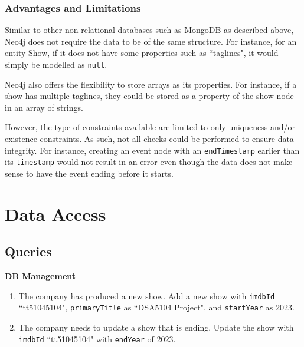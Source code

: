 \documentclass[10pt,titlepage]{article}
\begin{document}
\subsubsection{Advantages and Limitations}
Similar to other non-relational databases such as MongoDB as described above, Neo4j does not require the data to be of
the same structure. For instance, for an entity Show, if it does not have some properties such as ``taglines", it would
simply be modelled as \texttt{null}.

Neo4j also offers the flexibility to store arrays as its properties. For instance, if a show has multiple taglines, they could be stored as a property of the show node in an array of strings.

However, the type of constraints available are limited to only uniqueness and/or existence constraints. As such, not all checks
could be performed to ensure data integrity. For instance, creating an event node with an \texttt{endTimestamp} earlier
than its \texttt{timestamp} would not result in an error even though the data does not make sense to have the event
ending before it starts.

\pagebreak
\section{Data Access}

\subsection{Queries}
\textbf{DB Management}
\begin{enumerate}
    \item The company has produced a new show. Add a new show with \texttt{imdbId} ``tt51045104", \texttt{primaryTitle}
        as ``DSA5104 Project", and \texttt{startYear} as 2023.
    \item The company needs to update a show that is ending. Update the show with \texttt{imdbId} ``tt51045104" with
        \texttt{endYear} of 2023.
\end{enumerate}
\end{document}
